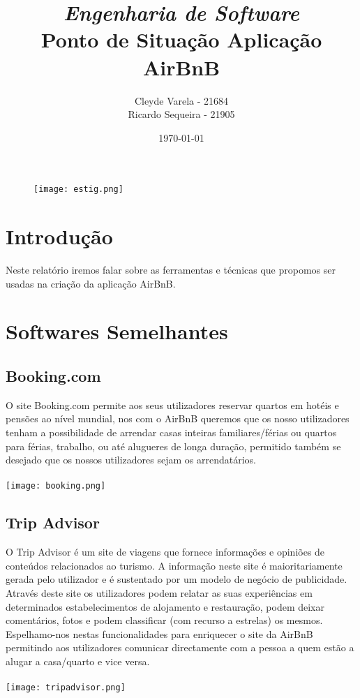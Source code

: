 \documentclass[a4paper]{article}
\title{\textit{Engenharia de Software}\\Ponto de Situação Aplicação AirBnB} %
\author{Cleyde Varela - 21684 \\ Ricardo Sequeira - 21905} %
\date{\today}
\begin{document}
\maketitle
\begin{figure}[!t]
    \texttt{[image: estig.png]}
\end{figure}
\newpage
\tableofcontents
\newpage

\section{Introdução}
Neste relatório iremos falar sobre as ferramentas e técnicas que propomos ser usadas na criação da aplicação AirBnB.

\newpage

\section{Softwares Semelhantes}
\subsection{Booking.com}
O site Booking.com permite aos seus utilizadores reservar quartos em hotéis e pensões ao nível mundial, nos com o AirBnB queremos que os nosso utilizadores tenham a possibilidade de arrendar casas inteiras familiares/férias ou quartos para férias, trabalho, ou até alugueres de longa duração, permitido também se desejado que os nossos utilizadores sejam os arrendatários. 
\\
\\
\texttt{[image: booking.png]}
\\
\newpage
\subsection{Trip Advisor}
O Trip Advisor é um site de viagens que fornece informações e opiniões de conteúdos relacionados ao turismo. A informação neste site é maioritariamente gerada pelo utilizador e é sustentado por um modelo de negócio de publicidade.
Através deste site os utilizadores podem relatar as suas experiências em determinados estabelecimentos de alojamento e restauração, podem deixar comentários, fotos e podem classificar (com recurso a estrelas) os mesmos.
Espelhamo-nos nestas funcionalidades para enriquecer o site da AirBnB permitindo aos utilizadores comunicar directamente com a pessoa a quem estão a alugar a casa/quarto e vice versa.
\\
\\
\texttt{[image: tripadvisor.png]}
\\
\newpage
\end{document}
